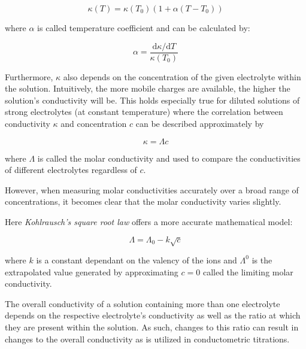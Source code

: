 \begin{equation} \label{eq:7.6}
    \kappa(T) = \kappa(T_0)(1 + \alpha(T - T_0))
\end{equation}

where $\alpha$ is called temperature coefficient and can be calculated by: 

\begin{equation} \label{eq:7.7}
    \alpha = \frac{\mathrm{d}\kappa / \mathrm{d}T}{\kappa(T_0)}
\end{equation}

Furthermore, $\kappa$ also depends on the concentration of the given electrolyte within the solution. Intuitively, the more mobile charges are available, the higher the solution's conductivity will be. This holds especially true for diluted solutions of strong electrolytes (at constant temperature) where the correlation between conductivity $\kappa$ and concentration $c$ can be described approximately by 

\begin{equation} \label{eq:7.8}
    \kappa = \Lambda c
\end{equation}

where $\Lambda$ is called the molar conductivity and used to compare the conductivities of different electrolytes regardless of $c$.

However, when measuring molar conductivities accurately over a broad range of concentrations, it becomes clear that the molar conductivity varies slightly.


Here \textit{Kohlrausch's square root law} offers a more accurate mathematical model:

\begin{equation} \label{eq:kohlrausch}
    \Lambda = \Lambda_0 - k \sqrt{c}
\end{equation}

where $k$ is a constant dependant on the valency of the ions and $\Lambda^0$ is the extrapolated value generated by approximating $c=0$ called the limiting molar conductivity.

The overall conductivity of a solution containing more than one electrolyte depends on the respective electrolyte's conductivity as well as the ratio at which they are present within the solution. As such, changes to this ratio can result in changes to the overall conductivity as is utilized in conductometric titrations. 

